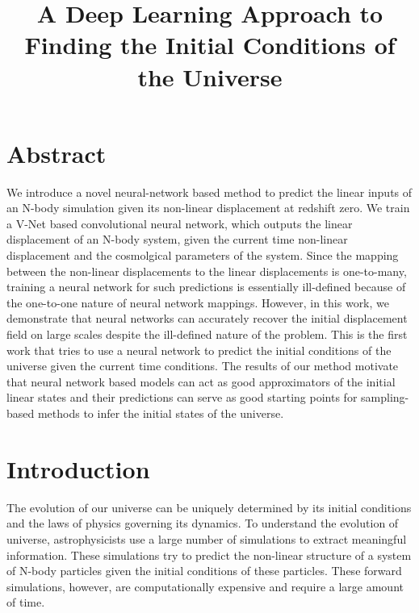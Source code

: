 \documentclass[11pt]{article}
\title{A Deep Learning Approach to Finding the Initial Conditions of the Universe}
\makeatletter
\let\inserttitle\@title
\makeatother
\begin{document}
\begin{center}
  \LARGE{\inserttitle}

  \Large{\insertauthor}
\end{center}

\section{Abstract}

We introduce a novel neural-network based method to predict the linear inputs of an N-body simulation given its non-linear displacement at redshift zero. 
We train a V-Net based convolutional neural network, which outputs the linear displacement of an N-body system, given the current time non-linear displacement and the cosmolgical parameters of the system.
Since the mapping between the non-linear displacements to the linear displacements is one-to-many, training a neural network for such predictions is essentially ill-defined because of the one-to-one nature of neural network mappings. 
However, in this work, we demonstrate that neural networks can accurately recover the initial displacement field on large scales despite the ill-defined nature of the problem.
This is the first work that tries to use a neural network to predict the initial conditions of the universe given the current time conditions.
The results of our method motivate that neural network based models can act as good approximators of the initial linear states and their predictions can serve as good starting points for sampling-based methods to infer the initial states of the universe.

\section{Introduction}

The evolution of our universe can be uniquely determined by its initial conditions and the laws of physics governing its dynamics. To understand the evolution of  universe, astrophysicists use a large number of simulations to extract meaningful information. These simulations try to predict the non-linear structure of a system of N-body particles given the initial conditions of these particles. These forward simulations, however, are computationally expensive and require a large amount of time.
\end{document}
